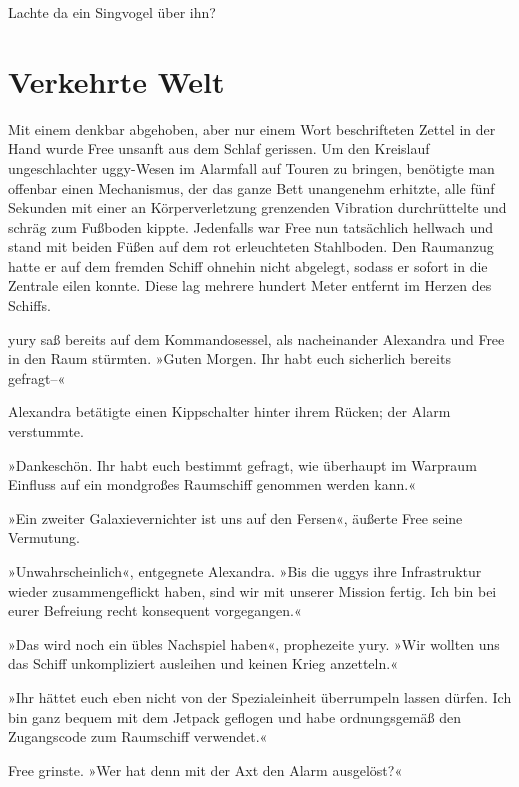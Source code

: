 Lachte da ein Singvogel über ihn?


\chapter{Verkehrte Welt}

Mit einem denkbar abgehoben, aber nur einem Wort beschrifteten Zettel in der Hand wurde Free unsanft aus dem Schlaf gerissen. Um den Kreislauf ungeschlachter uggy-Wesen im Alarmfall auf Touren zu bringen, benötigte man offenbar einen Mechanismus, der das ganze Bett unangenehm erhitzte, alle fünf Sekunden mit einer an Körperverletzung grenzenden Vibration durchrüttelte und schräg zum Fußboden kippte. Jedenfalls war Free nun tatsächlich hellwach und stand mit beiden Füßen auf dem rot erleuchteten Stahlboden. Den Raumanzug hatte er auf dem fremden Schiff ohnehin nicht abgelegt, sodass er sofort in die Zentrale eilen konnte. Diese lag mehrere hundert Meter entfernt im Herzen des Schiffs.


yury saß bereits auf dem Kommandosessel, als nacheinander Alexandra und Free in den Raum stürmten. »Guten Morgen. Ihr habt euch sicherlich bereits gefragt–«

 Alexandra betätigte einen Kippschalter hinter ihrem Rücken; der Alarm verstummte.

»Dankeschön. Ihr habt euch bestimmt gefragt, wie überhaupt im Warpraum Einfluss auf ein mondgroßes Raumschiff genommen werden kann.«

»Ein zweiter Galaxievernichter ist uns auf den Fersen«, äußerte Free seine Vermutung.

»Unwahrscheinlich«, entgegnete Alexandra. »Bis die uggys ihre Infrastruktur wieder zusammengeflickt haben, sind wir mit unserer Mission fertig. Ich bin bei eurer Befreiung recht konsequent vorgegangen.«

»Das wird noch ein übles Nachspiel haben«, prophezeite yury. »Wir wollten uns das Schiff unkompliziert ausleihen und keinen Krieg anzetteln.«

»Ihr hättet euch eben nicht von der Spezialeinheit überrumpeln lassen dürfen. Ich bin ganz bequem mit dem Jetpack geflogen und habe ordnungsgemäß den Zugangscode zum Raumschiff verwendet.«

Free grinste. »Wer hat denn mit der Axt den Alarm ausgelöst?«

